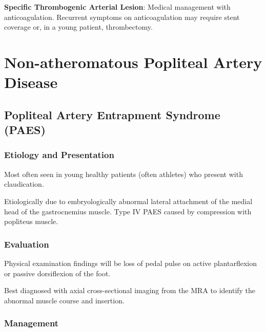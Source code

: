 \documentclass[
]{book}
\begin{document}
\textbf{Specific Thrombogenic Arterial Lesion}: Medical management with
anticoagulation. Recurrent symptoms on anticoagulation may
require stent coverage or, in a young patient, thrombectomy.
\citep{reyesvaldiviaAnticoagulationAloneAortic2017, jeyabalanEndovascularStrategiesTreatment2014, vermaContemporaryManagementSymptomatic2014}

\hypertarget{non-atheromatous-popliteal-artery-disease}{%
\section{Non-atheromatous Popliteal Artery Disease}\label{non-atheromatous-popliteal-artery-disease}}

\hypertarget{popliteal-artery-entrapment-syndrome-paes}{%
\subsection{Popliteal Artery Entrapment Syndrome (PAES)}\label{popliteal-artery-entrapment-syndrome-paes}}

\hypertarget{etiology-and-presentation-2}{%
\subsubsection{Etiology and Presentation}\label{etiology-and-presentation-2}}

Most often seen in young healthy patients (often athletes) who present
with claudication.

Etiologically due to embryologically abnormal lateral attachment of the medial
head of the gastrocnemius muscle.\citep{gokkus2014, lejay2014} Type IV PAES
caused by compression with popliteus muscle.

\hypertarget{evaluation-14}{%
\subsubsection{Evaluation}\label{evaluation-14}}

Physical examination findings will be loss of pedal pulse on active
plantarflexion or passive dorsiflexion of the foot.\citep{gokkus2014, lejay2014}

Best diagnosed with axial cross-sectional imaging from the MRA to
identify the abnormal muscle course and insertion. \citep{sinha2012, lejay2014}

\hypertarget{management-21}{%
\subsubsection{Management}\label{management-21}}
\end{document}
